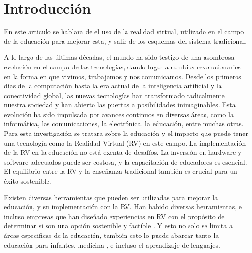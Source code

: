 \section{Introducción}

En este articulo se hablara de el uso de la realidad virtual, utilizado en el campo de la educación para mejorar esta, y salir de los esquemas del sistema tradicional.

A lo largo de las últimas décadas, el mundo ha sido testigo de una asombrosa evolución en el campo de las tecnologías, dando lugar a cambios revolucionarios en la forma en que vivimos, trabajamos y nos comunicamos. Desde los primeros días de la computación hasta la era actual de la inteligencia artificial y la conectividad global, las nuevas tecnologías han transformado radicalmente nuestra sociedad y han abierto las puertas a posibilidades inimaginables. Esta evolución ha sido impulsada por avances continuos en diversas áreas, como la informática, las comunicaciones, la electrónica, la educación, entre muchas otras. Para esta investigación se tratara sobre la educación y el impacto que puede tener una tecnología como la Realidad Virtual (RV) en este campo. La implementación de la RV en la educación no está exenta de desafíos. La inversión en hardware y software adecuados puede ser costosa, y la capacitación de educadores es esencial. El equilibrio entre la RV y la enseñanza tradicional también es crucial para un éxito sostenible.

Existen diversas herramientas que pueden ser utilizadas para mejorar la educación, y su implementación con la RV. Han habido diversas herramientas, e incluso empresas que han diseñado experiencias en RV con el propósito de determinar si son una opción sostenible y factible \parencite{SHIM2023100010}. Y esto no solo se limita a áreas especificas de la educación, también esto lo puede abarcar tanto la educación para infantes, medicina \parencite{GUERRERO2022100002}, e incluso el aprendizaje de lenguajes. \parencite{YUDINTSEVA2023100018, ZAMMIT2023100035}

%

%
